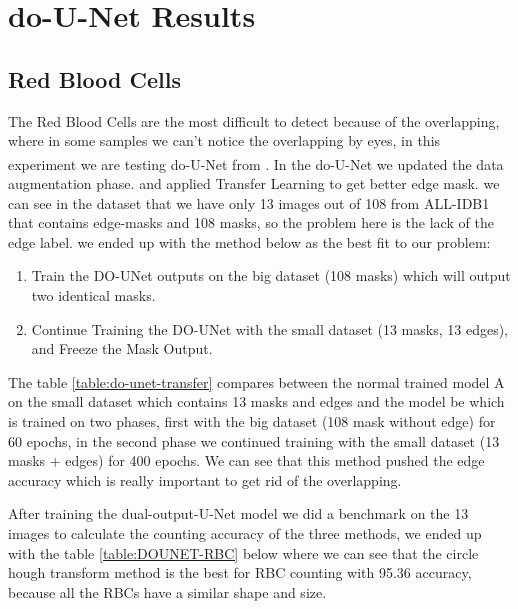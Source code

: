 \section{do-U-Net Results}
\subsection{Red Blood Cells}
\hspace{\parindent}
The Red Blood Cells are the most difficult to detect because of the overlapping, where in some samples we can't notice the overlapping by eyes, in this experiment we are testing do-U-Net from \textsuperscript{\cite{10.1007/978-3-030-44584-3_31}}.
In the do-U-Net we updated the data augmentation phase. and applied Transfer Learning to get better edge mask. we can see in the dataset that we have only 13 images out of 108 from ALL-IDB1 that contains edge-masks and 108 masks, so the problem here is the lack of the edge label. we ended up with the method below as the best fit to our problem:

\begin{enumerate}
    \item Train the DO-UNet outputs on the big dataset (108 masks) which will output two identical masks.
    \item Continue Training the DO-UNet with the small dataset (13 masks, 13 edges), and Freeze the Mask Output.
\end{enumerate}



The table \ref{table:do-unet-transfer} compares between the normal trained model A on the small dataset which contains 13 masks and edges and the model be which is trained on two phases, first with the big dataset (108 mask without edge) for 60 epochs, in the second phase we continued training with the small dataset (13 masks + edges) for 400 epochs.
We can see that this method pushed the edge accuracy which is really important to get rid of the overlapping.

After training the dual-output-U-Net model we did a benchmark on the 13 images to calculate the counting accuracy of the three methods, we ended up with the table \ref{table:DOUNET-RBC} below where we can see that the circle hough transform method is the best for RBC counting with 95.36 accuracy, because all the RBCs have a similar shape and size.



